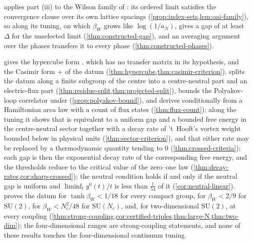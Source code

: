 \documentclass[11pt,a4paper]{amsart}
\theoremstyle{definition}
\theoremstyle{remark}
\numberwithin{equation}{section}
\newcommand{\SU}{\mathrm{SU}}              %
\newcommand{\Mcirc}{\text{\upshape(M$^{\circ}$)}}   %
\newcommand{\Hcirc}{\text{\upshape(H$^{\circ}$)}}   %
\newcommand{\hypN}{\text{\upshape(N)}}              %
\newcommand{\hypP}{\text{\upshape(P)}}              %
\newcommand{\Kone}{\text{\upshape(K1)}}             %
\newcommand{\Ktwo}{\text{\upshape(K2)}}             %
\newcommand{\aN}{a_N}                      %
\newcommand{\betaW}{\beta_{W}}             %
\begin{document}
 applies part (iii) to the Wilson family of \cite{openaiym}: its ordered limit satisfies the convergence clause over its own lattice spacings (\cref{prop:index-sets,lem:oai-family}), so \Mcirc{} along its tuning, on which $\betaW$ grows like $\log(1/\aN)$, gives a gap of at least $\Delta$ for the unselected limit (\cref{thm:constructed-gap}), and an averaging argument over the phases transfers it to every phase (\cref{thm:constructed-phases}).

 gives the hypercube form \Hcirc, which has no transfer matrix in its hypothesis, and the Casimir form \Kone+\Ktwo{} of the datum (\cref{thm:hypercube,thm:casimir-criterion}).  splits the datum along a finite subgroup of the centre into a centre-neutral part \hypN{} and an electric-flux part \hypP{} (\cref{thm:residue-split,thm:projected-split}), bounds the Polyakov-loop correlator under \Mcirc{} (\cref{prop:polyakov-bound}), and derives \hypP{} conditionally from a Hamiltonian area law with a count of flux states (\cref{thm:flux-count}); along the tuning it shows that \Mcirc{} is equivalent to a uniform gap and a bounded free energy in the centre-neutral sector together with a decay rate of 't~Hooft's vortex weight bounded below in physical units (\cref{thm:sector-criterion}), and that either rate may be replaced by a thermodynamic quantity tending to $0$ (\cref{thm:crossed-criteria}); each gap is then the exponential decay rate of the corresponding free energy, and the thresholds reduce to the critical value of the zero--one law (\cref{thm:decay-rates,cor:sharp-crossed}); the neutral condition holds if and only if the neutral gap is uniform and $\liminf_ty^0(t)/t$ is less than $\frac1{54}$ of it (\cref{cor:neutral-linear}).  proves the datum for $\tanh\betaW<1/18$ for every compact group, for $\betaW<2/9$ for $\SU(2)$, for $\betaW<N_c^2/48$ for $\SU(N_c)$, and, for two-dimensional $\SU(2)$, at every coupling (\cref{thm:strong-coupling,cor:certified-triples,thm:large-N,thm:two-dim}); the four-dimensional ranges are strong-coupling statements, and none of these results touches the four-dimensional continuum tuning.
\end{document}
